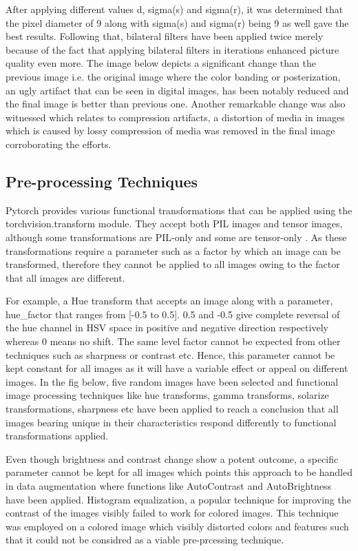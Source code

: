 \documentclass[conference]{IEEEtran}
\begin{document}
After applying different values d, sigma(s) and sigma(r), it was determined that the pixel diameter of 9 along with sigma(s) and sigma(r) being 9 as well gave the best results. Following that, bilateral filters have been applied twice merely because of the fact that applying bilateral filters in iterations enhanced picture quality even more. The image below depicts a significant change than the previous image i.e. the original image where the color banding or posterization, an ugly artifact that can be seen in digital images, has been notably reduced \cite{b16} and the final image is better than previous one. Another remarkable change was also witnessed which relates to compression artifacts, a distortion of media in images which is caused by lossy compression of media was removed  in the final image corroborating the efforts. 

\subsection{Pre-processing Techniques}
Pytorch provides various functional transformations that can be applied using the torchvision.transform module. They accept both PIL images and tensor images, although some transformations are PIL-only and some are tensor-only \cite{17}. As these transformations require a parameter such as a factor by which an image can be transformed, therefore they cannot be applied to all images owing to the factor that all images are different. 

For example, a Hue transform that accepts an image along with a parameter, hue\_factor that ranges from [-0.5 to 0.5]. 0.5 and -0.5 give complete reversal of the hue channel in HSV space in positive and negative direction respectively whereas 0 means no shift. The same level factor cannot be expected from other techniques such as sharpness or contrast etc. Hence, this parameter cannot be kept constant for all images as it will have a variable effect or appeal on different images. In the fig below, five random images have been selected and functional image processing techniques like hue transforms, gamma transforms, solarize transformations, sharpness etc have been applied to reach a conclusion that all images bearing unique in their characteristics respond differently to functional transformations applied. 

Even though brightness and contrast change show a potent outcome, a specific parameter cannot be kept for all images which points this approach to be handled in data augmentation where functions like AutoContrast and AutoBrightness have been applied. Histogram equalization, a popular technique for improving the contrast of the images visibly failed to work for colored images. This technique was employed on a colored image which visibly distorted colors and features such that it could not be considred as a viable pre-prcessing technique.
\end{document}
